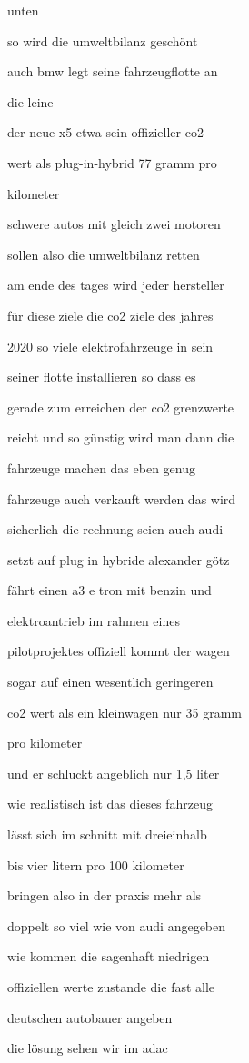 \documentclass[a4paper, 11pt]{book} %
\begin{document}
unten

so wird die umweltbilanz geschönt

auch bmw legt seine fahrzeugflotte an

die leine

der neue x5 etwa sein offizieller co2

wert als plug-in-hybrid 77 gramm pro

kilometer

schwere autos mit gleich zwei motoren

sollen also die umweltbilanz retten

am ende des tages wird jeder hersteller

für diese ziele die co2 ziele des jahres

2020 so viele elektrofahrzeuge in sein

seiner flotte installieren so dass es

gerade zum erreichen der co2 grenzwerte

reicht und so günstig wird man dann die

fahrzeuge machen das eben genug

fahrzeuge auch verkauft werden das wird

sicherlich die rechnung seien auch audi

setzt auf plug in hybride alexander götz

fährt einen a3 e tron mit benzin und

elektroantrieb im rahmen eines

pilotprojektes offiziell kommt der wagen

sogar auf einen wesentlich geringeren

co2 wert als ein kleinwagen nur 35 gramm

pro kilometer

und er schluckt angeblich nur 1,5 liter

wie realistisch ist das dieses fahrzeug

lässt sich im schnitt mit dreieinhalb

bis vier litern pro 100 kilometer

bringen also in der praxis mehr als

doppelt so viel wie von audi angegeben

wie kommen die sagenhaft niedrigen

offiziellen werte zustande die fast alle

deutschen autobauer angeben

die lösung sehen wir im adac
\end{document}
